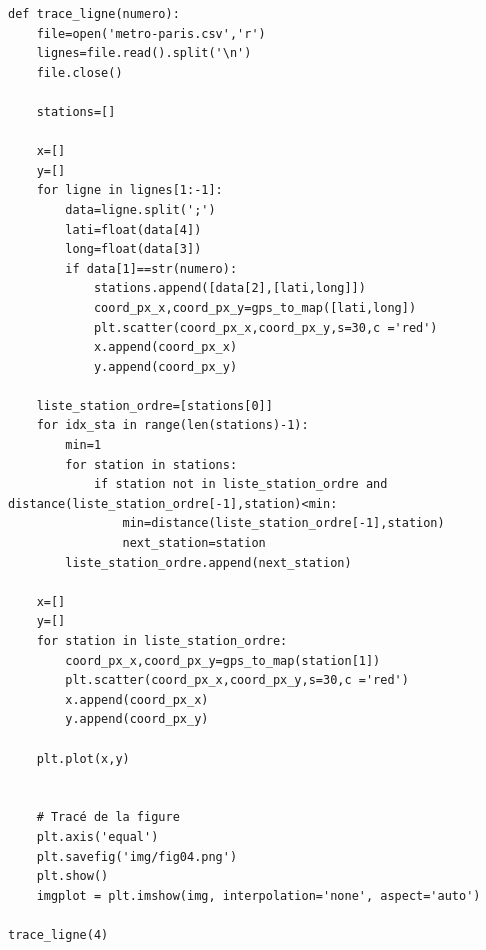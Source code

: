 \begin{verbatim}
def trace_ligne(numero):
    file=open('metro-paris.csv','r')
    lignes=file.read().split('\n')
    file.close()

    stations=[]

    x=[]
    y=[]
    for ligne in lignes[1:-1]:
        data=ligne.split(';')
        lati=float(data[4])
        long=float(data[3])
        if data[1]==str(numero):
            stations.append([data[2],[lati,long]])
            coord_px_x,coord_px_y=gps_to_map([lati,long])
            plt.scatter(coord_px_x,coord_px_y,s=30,c ='red')
            x.append(coord_px_x)
            y.append(coord_px_y)

    liste_station_ordre=[stations[0]]
    for idx_sta in range(len(stations)-1):
        min=1
        for station in stations:
            if station not in liste_station_ordre and distance(liste_station_ordre[-1],station)<min:
                min=distance(liste_station_ordre[-1],station)
                next_station=station
        liste_station_ordre.append(next_station)

    x=[]
    y=[]
    for station in liste_station_ordre:
        coord_px_x,coord_px_y=gps_to_map(station[1])
        plt.scatter(coord_px_x,coord_px_y,s=30,c ='red')
        x.append(coord_px_x)
        y.append(coord_px_y)

    plt.plot(x,y)


    # Tracé de la figure
    plt.axis('equal')
    plt.savefig('img/fig04.png')
    plt.show()
    imgplot = plt.imshow(img, interpolation='none', aspect='auto')

trace_ligne(4)
\end{verbatim}


